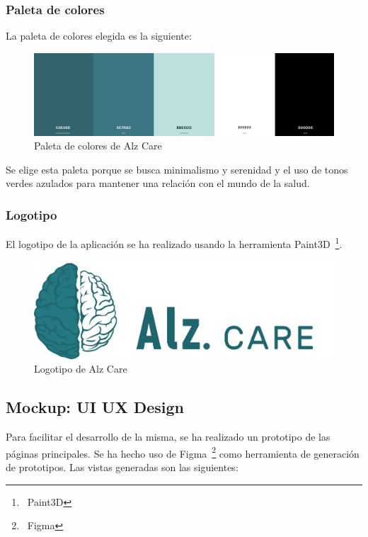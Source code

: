 \subsubsection{Paleta de colores}

La paleta de colores elegida es la siguiente:

\begin{figure}[H]
    \centering
    \includegraphics[width=\textwidth]{./imgs/app/paleta}
    \caption{Paleta de colores de Alz Care}
    \label{fig:paleta-colores}
\end{figure}

Se elige esta paleta porque se busca minimalismo y serenidad y el uso de tonos verdes azulados para mantener una
relación con el mundo de la salud.

\subsubsection{Logotipo}

El logotipo de la aplicación se ha realizado usando la herramienta
Paint3D~\footnote{~\cite{paint-3d}{Paint3D}}.

\begin{figure}[H]
    \centering
    \includegraphics[width=\textwidth]{./imgs/app/icon-name}
    \caption{Logotipo de Alz Care}
    \label{fig:logotipo}
\end{figure}

\subsection{Mockup: UI UX Design}\label{subsec:mockup:-ui-ux-design}
Para facilitar el desarrollo de la misma, se ha realizado un prototipo de las páginas principales.
Se ha hecho uso de Figma~\footnote{~\cite{figma}{Figma}} como herramienta de generación de prototipos.
Las vistas generadas son las siguientes:

